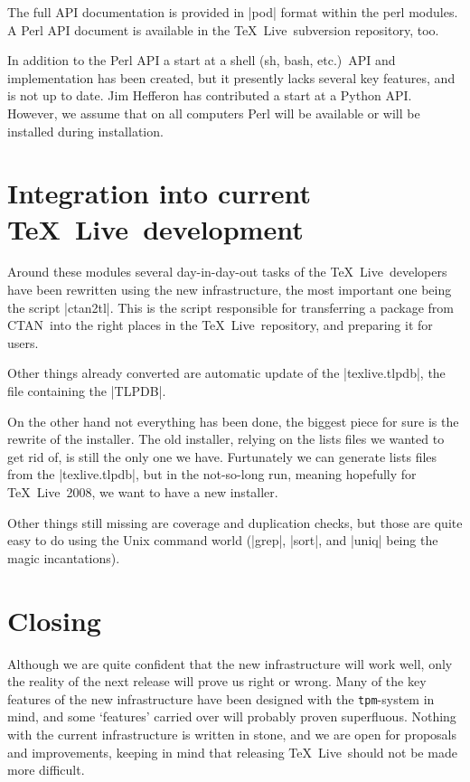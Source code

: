 \documentclass{arstexnica}
\newcommand{\tl}{\TeX~Live}
\newcommand{\ctan}{CTAN}
\newcommand{\tpm}{\texttt{tpm}}
\begin{document}
\begin{article}
The full API documentation is provided in |pod| format within the perl
modules. A Perl API document
is available in the \tl\ subversion repository, too.

In addition to the Perl API a start at a shell (sh, bash, etc.)\ API and
implementation has been created, but it presently lacks several key features,
and is not up to date. Jim Hef{}feron has contributed a start at a Python API.
However, we assume that on all computers Perl will be
available or will be installed during installation.

\section{Integration into current \tl\ development}

Around these modules several day-in-day-out tasks of the \tl\
developers have been rewritten using the new infrastructure, the most
important one being the script |ctan2tl|. This is the script responsible for
transferring a package from \ctan\ into the right places in
the \tl\ repository, and preparing it for users.

Other things already converted are automatic update of the
|texlive.tlpdb|, the file containing the |TLPDB|.

On the other hand not everything has been done, the biggest piece for
sure is the rewrite of the installer. The old installer, relying on
the lists files we wanted to get rid of, is still the only one we
have. Furtunately we can generate lists files from the
|texlive.tlpdb|, but in the not-so-long run, meaning hopefully for
\tl~2008, we want to have a new installer.

Other things still missing are coverage and duplication checks, but
those are quite easy to do using the Unix command world (|grep|,
|sort|, and |uniq| being the magic incantations).

\section{Closing}
\label{sec:closing}

Although we are quite confident that the new infrastructure will work
well, only the reality of the next release will prove us right or
wrong. Many of the key features of the new infrastructure have been
designed with the \tpm-system in mind, and some `features' carried
over will probably proven superfluous. Nothing with the current
infrastructure is written in stone, and we are open for proposals and
improvements, keeping in mind that releasing \tl\ should not be made
more difficult. 


\end{article}
\end{document}
